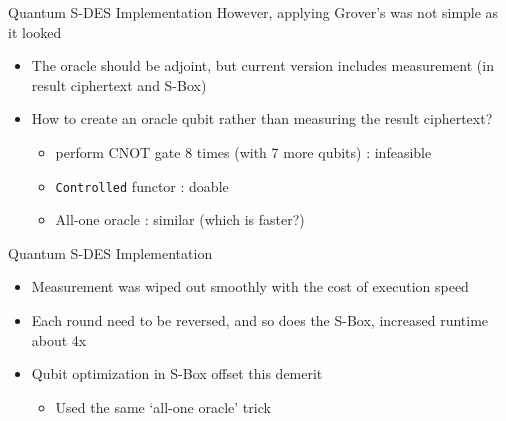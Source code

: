 \documentclass{beamer}
\begin{document}
   	\begin{frame}{Quantum S-DES Implementation}
        However, applying Grover's was not simple as it looked
        \begin{itemize}
            \item The oracle should be adjoint, but current version includes measurement (in result ciphertext and S-Box)
            \item How to create an oracle qubit rather than measuring the result ciphertext?
            \begin{itemize}
                \item perform CNOT gate 8 times (with 7 more qubits) : infeasible
                \item \texttt{Controlled} functor : doable
                \item All-one oracle : similar (which is faster?)
            \end{itemize}
        \end{itemize}
        
   	\end{frame}
       
   	\begin{frame}{Quantum S-DES Implementation}
        \begin{itemize}
            \item Measurement was wiped out smoothly with the cost of execution speed
            \item Each round need to be reversed, and so does the S-Box, increased runtime about 4x
            \item Qubit optimization in S-Box offset this demerit
            \begin{itemize}
                \item Used the same `all-one oracle' trick
            \end{itemize}
        \end{itemize}
   	\end{frame}
       
\end{document}
